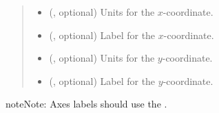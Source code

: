 \documentclass[letterpaper,10pt,english]{sphinxmanual}
\begin{document}
\begin{fulllineitems}
\begin{fulllineitems}
\begin{quote}
\begin{description}
\begin{itemize}
\item {} 
 (, optional) \textendash{} Units for the \(x\)-coordinate.

\item {} 
 (, optional) \textendash{} Label for the \(x\)-coordinate.

\item {} 
 (, optional) \textendash{} Units for the \(y\)-coordinate.

\item {} 
 (, optional) \textendash{} Label for the \(y\)-coordinate.

\end{itemize}

\end{description}\end{quote}

\begin{sphinxadmonition}{note}{Note:}
Axes labels should use the .
\end{sphinxadmonition}

\end{fulllineitems}


\end{fulllineitems}

\end{document}
